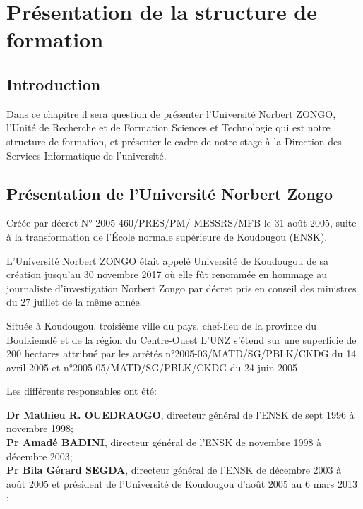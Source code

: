 \chapter{Présentation de la structure de formation}
\begin{spacing}{1.2}
\minitoc
\thispagestyle{MyStyle}
\end{spacing}
\newpage

\section*{Introduction}
Dans ce chapitre il sera question de présenter l’Université Norbert ZONGO, l’Unité de Recherche et de Formation Sciences et Technologie qui est notre structure de formation, et présenter le cadre de notre stage à la Direction des Services Informatique de l’université.
\section{Présentation de l’Université Norbert Zongo}
Créée par décret N° 2005-460/PRES/PM/ MESSRS/MFB le 31 août 2005, suite à la transformation de l’École normale supérieure de Koudougou (ENSK)\cite{infoUNZbf}.

\par L’Université Norbert ZONGO était appelé Université de Koudougou de sa création jusqu’au 30 novembre 2017 où elle fût renommée en hommage au journaliste d'investigation Norbert Zongo par décret pris en conseil des ministres du 27 juillet de la même année. \cite{infoUNZbf}
 
\par Située à Koudougou, troisième ville du pays, chef-lieu de la province du Boulkiemdé et de la région du Centre-Ouest L’UNZ s’étend sur une superficie de 200 hectares attribué par les arrêtés n°2005-03/MATD/SG/PBLK/CKDG du 14 avril 2005 et n°2005-05/MATD/SG/PBLK/CKDG du 24 juin 2005 \cite{infoUNZbf}.
\par

Les différents responsables ont été:

\textbf{Dr Mathieu R. OUEDRAOGO}, directeur général de l’ENSK de sept 1996 à novembre 1998;\\

\textbf{Pr Amadé BADINI}, directeur général de l’ENSK de novembre 1998 à décembre 2003;\\

\textbf{Pr Bila Gérard SEGDA}, directeur général de l’ENSK de décembre 2003 à août 2005 et président de l’Université de Koudougou d’août 2005 au 6 mars 2013 ;\\

